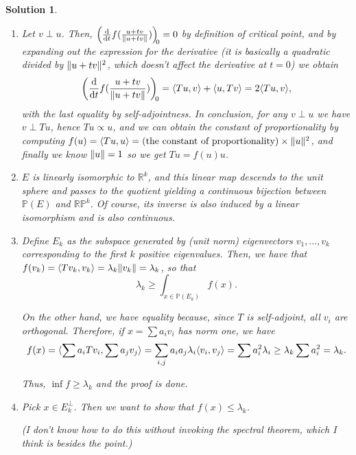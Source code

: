 \documentclass{article}
\theoremstyle{nonumberplain}
\newtheorem{sol}{Solution}
\newcommand{\R}{\mathbb{R}}
\newcommand{\PP}{\mathbb{P}}
\DeclarePairedDelimiter{\Norm}{\lVert}{\rVert}
\DeclarePairedDelimiter{\braket}{\langle}{\rangle}
\begin{document}
\begin{sol}
\leavevmode
\begin{enumerate}
\item Let $v \perp u$. Then, $\diff*{f(\frac{u + tv}{\Norm{u+tv}})}t[0] = 0$ by definition of critical point, and by expanding out the expression for the derivative (it is basically a quadratic divided by $\Norm{u+tv}^2$, which doesn't affect the derivative at $t = 0$) we obtain
\begin{equation}
\diff*{f(\frac{u + tv}{\Norm{u+tv}})}t[0] = \braket{Tu,v} + \braket{u,Tv} = 2 \braket{Tu,v},
\end{equation}
with the last equality by self-adjointness. In conclusion, for any $v \perp u$ we have $v \perp Tu$, hence $Tu \propto u$, and we can obtain the constant of proportionality by computing $f(u) = \braket{Tu,u} = \text{(the constant of proportionality)} \times \Norm{u}^2$, and finally we know $\Norm{u} = 1$ so we get $Tu = f(u) u$.

\item $E$ is linearly isomorphic to $\R^k$, and this linear map descends to the unit sphere and passes to the quotient yielding a continuous bijection between $\PP(E)$ and $\R\PP^k$. Of course, its inverse is also induced by a linear isomorphism and is also continuous.

\item Define  $E_k$ as the subspace generated by (unit norm) eigenvectors $v_1, \dots, v_k$ corresponding to the first $k$ positive eigenvalues. Then, we have that $f(v_k) = \braket{Tv_k,v_k} = \lambda_k \Norm{v_k} = \lambda_k$, so that
\begin{equation}
\lambda_k \geq \int_{x \in \PP(E_k)}f(x).
\end{equation}

On the other hand, we have equality because, since $T$ is self-adjoint, all $v_i$ are orthogonal. Therefore, if $x = \sum a_i v_i$ has norm one, we have
\begin{equation}
f(x) = \braket{\sum a_i Tv_i, \sum a_j v_j} = \sum_{i,j} a_i a_j \lambda_i \braket{v_i, v_j} = \sum a_i^2 \lambda_i \geq \lambda_k \sum a_i^2 = \lambda_k.
\end{equation}

Thus, $\inf f \geq \lambda_k$ and the proof is done.

\item Pick $x \in E_k^\perp$. Then we want to show that $f(x) \leq \lambda_k$.

(I don't know how to do this without invoking the spectral theorem, which I think is besides the point.)
\end{enumerate}
\end{sol}
\end{document}
